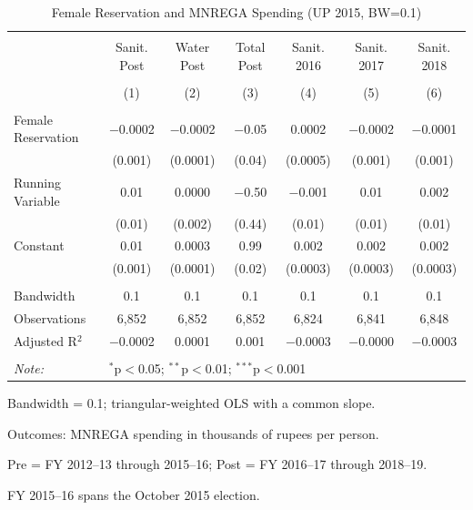 \begin{table}
\centering
\begin{threeparttable}

  \caption{Female Reservation and MNREGA Spending (UP 2015, BW=0.1)} 
  \label{tab:mnrega_up_cdm_bw10} 
\scriptsize 
\begin{tabular}{@{\extracolsep{0pt}}lcccccc} 
\\[-1.8ex]\hline 
\hline \\[-1.8ex] 
 & Sanit. Post & Water Post & Total Post & Sanit. 2016 & Sanit. 2017 & Sanit. 2018 \\ 
\\[-1.8ex] & (1) & (2) & (3) & (4) & (5) & (6)\\ 
\hline \\[-1.8ex] 
 Female Reservation & $-$0.0002 & $-$0.0002 & $-$0.05 & 0.0002 & $-$0.0002 & $-$0.0001 \\ 
  & (0.001) & (0.0001) & (0.04) & (0.0005) & (0.001) & (0.001) \\ 
  Running Variable & 0.01 & 0.0000 & $-$0.50 & $-$0.001 & 0.01 & 0.002 \\ 
  & (0.01) & (0.002) & (0.44) & (0.01) & (0.01) & (0.01) \\ 
  Constant & 0.01 & 0.0003 & 0.99 & 0.002 & 0.002 & 0.002 \\ 
  & (0.001) & (0.0001) & (0.02) & (0.0003) & (0.0003) & (0.0003) \\ 
 \hline \\[-1.8ex] 
Bandwidth & 0.1 & 0.1 & 0.1 & 0.1 & 0.1 & 0.1 \\ 
Observations & 6,852 & 6,852 & 6,852 & 6,824 & 6,841 & 6,848 \\ 
Adjusted R$^{2}$ & $-$0.0002 & 0.0001 & 0.001 & $-$0.0003 & $-$0.0000 & $-$0.0003 \\ 
\hline 
\hline \\[-1.8ex] 
\textit{Note:}  & \multicolumn{6}{l}{$^{*}$p$<$0.05; $^{**}$p$<$0.01; $^{***}$p$<$0.001} \\ 
\end{tabular} 
\begin{tablenotes}[flushleft]
\setlength{\itemindent}{0em}
\scriptsize
\item[] Bandwidth = 0.1; triangular-weighted OLS with a common slope.
\item[] Outcomes: MNREGA spending in thousands of rupees per person.
\item[] Pre = FY 2012--13 through 2015--16; Post = FY 2016--17 through 2018--19.
\item[] FY 2015--16 spans the October 2015 election.

\end{tablenotes}
\end{threeparttable}
\end{table}
